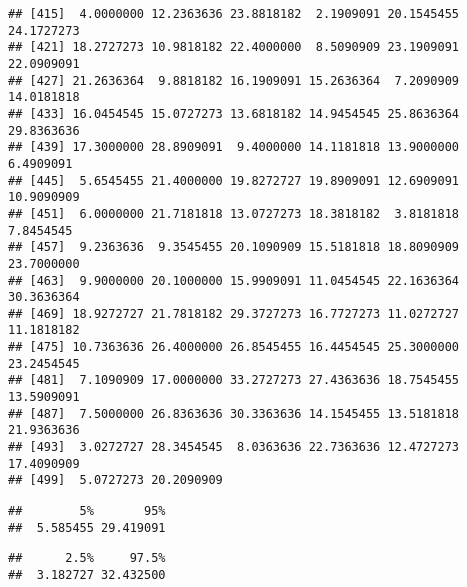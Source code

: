 \documentclass[]{book}
\newenvironment{Shaded}{\begin{snugshade}}{\end{snugshade}}
\newcommand{\CommentTok}[1]{\textcolor[rgb]{0.56,0.35,0.01}{\textit{#1}}}
\newcommand{\FloatTok}[1]{\textcolor[rgb]{0.00,0.00,0.81}{#1}}
\newcommand{\KeywordTok}[1]{\textcolor[rgb]{0.13,0.29,0.53}{\textbf{#1}}}
\newcommand{\NormalTok}[1]{#1}
\begin{document}
\begin{verbatim}
## [415]  4.0000000 12.2363636 23.8818182  2.1909091 20.1545455 24.1727273
## [421] 18.2727273 10.9818182 22.4000000  8.5090909 23.1909091 22.0909091
## [427] 21.2636364  9.8818182 16.1909091 15.2636364  7.2090909 14.0181818
## [433] 16.0454545 15.0727273 13.6818182 14.9454545 25.8636364 29.8363636
## [439] 17.3000000 28.8909091  9.4000000 14.1181818 13.9000000  6.4909091
## [445]  5.6545455 21.4000000 19.8272727 19.8909091 12.6909091 10.9090909
## [451]  6.0000000 21.7181818 13.0727273 18.3818182  3.8181818  7.8454545
## [457]  9.2363636  9.3545455 20.1090909 15.5181818 18.8090909 23.7000000
## [463]  9.9000000 20.1000000 15.9909091 11.0454545 22.1636364 30.3636364
## [469] 18.9272727 21.7818182 29.3727273 16.7727273 11.0272727 11.1818182
## [475] 10.7363636 26.4000000 26.8545455 16.4454545 25.3000000 23.2454545
## [481]  7.1090909 17.0000000 33.2727273 27.4363636 18.7545455 13.5909091
## [487]  7.5000000 26.8363636 30.3363636 14.1545455 13.5181818 21.9363636
## [493]  3.0272727 28.3454545  8.0363636 22.7363636 12.4727273 17.4090909
## [499]  5.0727273 20.2090909
\end{verbatim}

\begin{Shaded}
\end{Shaded}

\begin{verbatim}
##        5%       95% 
##  5.585455 29.419091
\end{verbatim}

\begin{Shaded}
\end{Shaded}

\begin{verbatim}
##      2.5%     97.5% 
##  3.182727 32.432500
\end{verbatim}

\begin{Shaded}
\end{Shaded}
\end{document}
